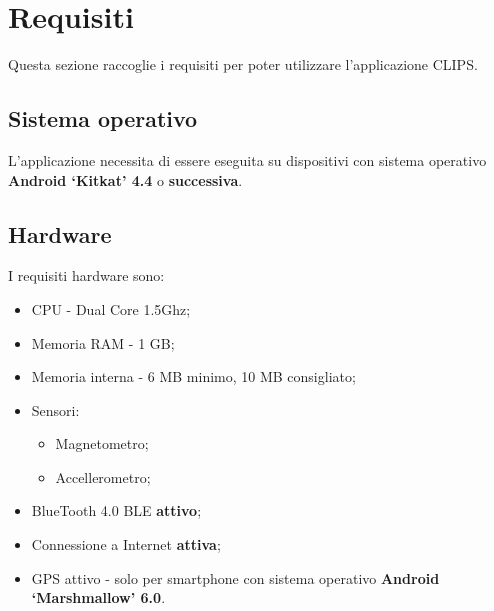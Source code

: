 \documentclass[../ClipsManualeUtente.tex]{subfiles}
\begin{document}
\section{Requisiti}
	Questa sezione raccoglie i requisiti per poter utilizzare l'applicazione CLIPS.
	
	\subsection{Sistema operativo}
		L'applicazione necessita di essere eseguita su dispositivi con sistema operativo \textbf{Android `Kitkat' 4.4} o \textbf{successiva}.
	
	\subsection{Hardware}
		I requisiti hardware sono:
		\begin{itemize}
			\item CPU - Dual Core 1.5Ghz;
			\item Memoria RAM - 1 GB;
			\item Memoria interna - 6 MB minimo, 10 MB consigliato;
			\item Sensori:
			\begin{itemize}
				\item Magnetometro;
				\item Accellerometro;
			\end{itemize}
			\item BlueTooth 4.0 BLE \textbf{attivo};
			\item Connessione a Internet \textbf{attiva};
			\item GPS attivo - solo per smartphone con sistema operativo \textbf{Android `Marshmallow' 6.0}.
		\end{itemize}
		
	
		
\end{document}
